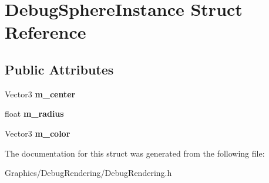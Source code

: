 \hypertarget{structDebugSphereInstance}{}\section{Debug\+Sphere\+Instance Struct Reference}
\label{structDebugSphereInstance}
\subsection*{Public Attributes}
\begin{DoxyCompactItemize}
\item 
\mbox{\label{structDebugSphereInstance_af998ca53b90737be1b18db99e7f09da9}} 
Vector3 {\bfseries m\+\_\+center}
\item 
\mbox{\label{structDebugSphereInstance_afde262deb97af3cb282f3d917daad640}} 
float {\bfseries m\+\_\+radius}
\item 
\mbox{\label{structDebugSphereInstance_a3dce51f10875fe29d06b56a5353da2d5}} 
Vector3 {\bfseries m\+\_\+color}
\end{DoxyCompactItemize}


The documentation for this struct was generated from the following file\+:\begin{DoxyCompactItemize}
\item 
Graphics/\+Debug\+Rendering/Debug\+Rendering.\+h\end{DoxyCompactItemize}
